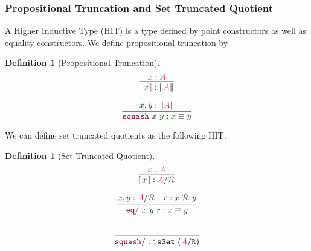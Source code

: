 \documentclass[xelatex,mathserif,serif,notheorems]{beamer} %
\theoremstyle{plain} %
\theoremstyle{definition}
\newtheorem{defn}[thm]{Definition}%
\theoremstyle{remark}
\newcommand*{\term}[1]{\textcolor{green!30!black}{#1}} %
\newcommand*{\type}[1]{\textcolor{magenta!90!black}{#1}}
\newcommand*{\relation}[1]{\textcolor{gray!75!black}{\ensuremath{\mathtt{#1}}}}
\newcommand*{\constructor}[1]{\textcolor{purple!60!black}{\ensuremath{\mathtt{#1}}}}
\newcommand*{\quotientconstructor}[1]{\constructor{[}\,#1\,\constructor{]}}
\newcommand{\setlengths}{
  \setlength{\abovedisplayskip}{4pt}
  \setlength{\belowdisplayskip}{4pt}
  \setlength{\abovedisplayshortskip}{2pt}
  \setlength{\belowdisplayshortskip}{2pt}
}
\newcommand{\startwitheq}{\vspace{-2.5mm}} %
\begin{document}
\begin{frame}
  \frametitle{Propositional Truncation and Set Truncated Quotient}
  A Higher Inductive Type (HIT) is a type defined by point constructors as well as equality constructors. We define propositional truncation by
  \begin{defn}[Propositional Truncation]\setlengths\startwitheq
    \strut
    \hfill
    \begin{minipage}[b]{0.25\linewidth}
      \begin{equation}
        \vcenter{\infer{\constructor{|}\,\term{x}\,\constructor{|} : \| \type{A} \|}{\term{x} : \type{A}}}
      \end{equation}
    \end{minipage}
    \hfill
    \begin{minipage}[b]{0.4\linewidth}
      \begin{equation}
        \vcenter{\infer{\constructor{squash}~\term{x}~\term{y} : \term{x} \equiv \term{y}}{\term{x}, \term{y} : \|\type{A}\|}}
      \end{equation}
    \end{minipage}
    \hfill
    \strut
  \end{defn}
  We can define set truncated quotients as the following HIT.
  \begin{defn}[Set Truncated Quotient]\setlengths \startwitheq
    \strut
    \hfill
    \begin{minipage}[b]{0.25\linewidth}
      \begin{equation}
        \vcenter{\infer{\quotientconstructor{\term{x}} : \type{A} / \relation{\mathcal{R}}}{\term{x} : \type{A}}}
      \end{equation}
    \end{minipage}
    \hfill
    \begin{minipage}[b]{0.4\linewidth}
      \begin{equation}
        \vcenter{\infer{\constructor{eq/}~\term{x}~\term{y}~\term{r} : \term{x} \equiv \term{y}}{\term{x}, \term{y} : \type{A} / \relation{\mathcal{R}} & \term{r} : \term{x}~\relation{\mathcal{R}}~\term{y}}}
      \end{equation}
    \end{minipage}
    \hfill
    \strut
    \begin{equation}
      \vcenter{\infer{\constructor{squash/} :\texttt{isSet}~(\type{A} / \relation{R})}{\strut}}
    \end{equation}
  \end{defn}
\end{frame}
\end{document}
